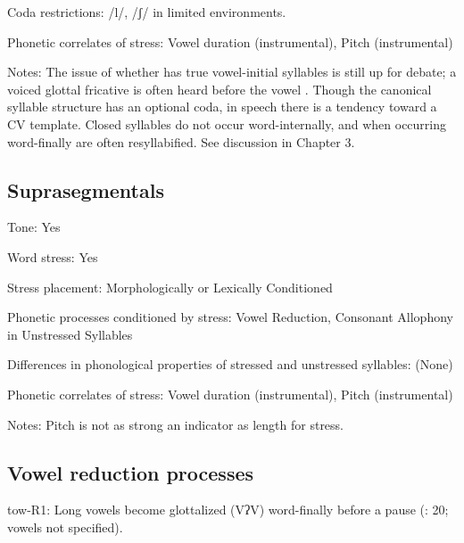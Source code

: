 {\begin{appendixdesc}
\item[Coda restrictions:] /l/, /ʃ/ in limited environments.

\item[Phonetic correlates of stress:] Vowel duration (instrumental), Pitch (instrumental)

\item[Notes:] The issue of whether  has true vowel-initial syllables is still up for debate; a voiced glottal fricative is often heard before the vowel \citep[22--23]{Yumitani1998}. Though the canonical syllable structure has an optional coda, in speech there is a tendency toward a CV template. Closed syllables do not occur word-internally, and when occurring word-finally are often resyllabified. See discussion in Chapter 3.
\end{appendixdesc}
\subsection*{Suprasegmentals}
\begin{appendixdesc}
\item[Tone:] Yes

\item[Word stress:] Yes

\item[Stress placement:] Morphologically or Lexically Conditioned

\item[Phonetic processes conditioned by stress:] Vowel Reduction, Consonant Allophony in Unstressed Syllables

\item[Differences in phonological properties of stressed and unstressed syllables:] (None)

\item[Phonetic correlates of stress:] Vowel duration (instrumental), Pitch (instrumental)

\item[Notes:] Pitch is not as strong an indicator as length for stress.
\end{appendixdesc}
\subsection*{Vowel reduction processes}
\begin{appendixdesc}

\item[tow-R1:] Long vowels become glottalized (VʔV) word-finally before a pause (\citealt{Yumitani1998}: 20; vowels not specified).


\end{appendixdesc}}
